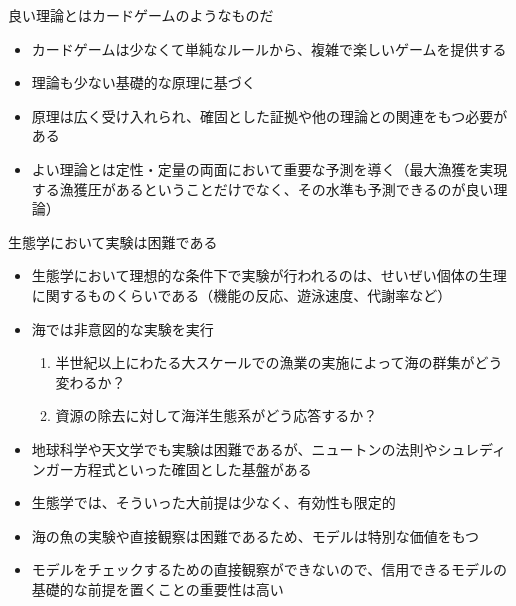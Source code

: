 \documentclass[
  ignorenonframetext,
]{beamer}
\providecommand{\tightlist}{%
  \setlength{\itemsep}{0pt}\setlength{\parskip}{0pt}}
\newcommand{\vspacelarge}{\vspace{6mm}}
\newcommand{\vspacesmall}{\vspace{3mm}}
\begin{document}
\begin{frame}{良い理論とはカードゲームのようなものだ}
\protect\hypertarget{ux826fux3044ux7406ux8ad6ux3068ux306fux30abux30fcux30c9ux30b2ux30fcux30e0ux306eux3088ux3046ux306aux3082ux306eux3060}{}

\begin{itemize}
\tightlist
\item
  カードゲームは少なくて単純なルールから、複雑で楽しいゲームを提供する\\
  \vspacelarge
\item
  理論も少ない基礎的な原理に基づく \vspacelarge
\item
  原理は広く受け入れられ、確固とした証拠や他の理論との関連をもつ必要がある\\
  \vspacelarge
\item
  よい理論とは定性・定量の両面において重要な予測を導く（最大漁獲を実現する漁獲圧があるということだけでなく、その水準も予測できるのが良い理論）
\end{itemize}

\end{frame}

\begin{frame}{生態学において実験は困難である}
\protect\hypertarget{ux751fux614bux5b66ux306bux304aux3044ux3066ux5b9fux9a13ux306fux56f0ux96e3ux3067ux3042ux308b}{}

\begin{itemize}
\tightlist
\item
  生態学において理想的な条件下で実験が行われるのは、せいぜい個体の生理に関するものくらいである（機能の反応、遊泳速度、代謝率など）\pause  
  \vspacesmall
\item
  海では非意図的な実験を実行

  \begin{enumerate}
  \tightlist
  \item
    半世紀以上にわたる大スケールでの漁業の実施によって海の群集がどう変わるか？\\
  \item
    資源の除去に対して海洋生態系がどう応答するか？\pause
  \end{enumerate}
\end{itemize}

\vspacesmall

\begin{itemize}
\tightlist
\item
  地球科学や天文学でも実験は困難であるが、ニュートンの法則やシュレディンガー方程式といった確固とした基盤がある\pause    
  \vspacesmall
\item
  生態学では、そういった大前提は少なく、有効性も限定的\pause    
  \vspacesmall
\item
  海の魚の実験や直接観察は困難であるため、モデルは特別な価値をもつ\pause    
  \vspacesmall
\item
  モデルをチェックするための直接観察ができないので、信用できるモデルの基礎的な前提を置くことの重要性は高い
\end{itemize}

\end{frame}
\end{document}
